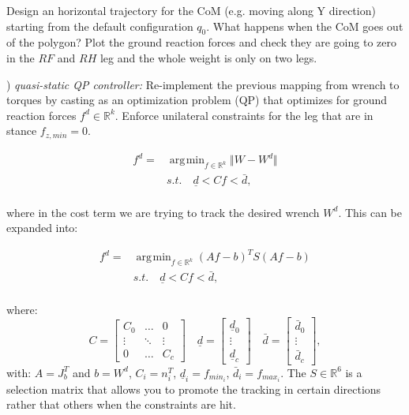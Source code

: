 \documentclass{report}
\newcommand{\Rnum}{\mathbb{R}} %
\newcommand{\mat}[1]{\ensuremath{\begin{bmatrix}#1\end{bmatrix}}}	%
\DeclareMathOperator*{\argmin}{\arg\!\min}				%
\begin{document}
Design an horizontal trajectory for the CoM (e.g. moving along Y direction) starting from the default configuration $q_0$. 
What happens when the CoM goes out of the polygon?
Plot the ground reaction forces and check they are going to zero in the $RF$ and $RH$ leg and the whole weight is only on two legs.

) \textit{quasi-static QP controller:}
Re-implement the previous mapping from wrench to torques by casting as an optimization problem (QP) that optimizes for ground reaction forces $f^d \in \Rnum^k$. 
Enforce unilateral constraints for the leg that are in stance $f_{z,min} = 0$. 

\begin{equation} 
\begin{aligned} 
f^d = & \argmin_{f \in \Rnum^k} \Vert W- W^d\Vert\\
& s.t. \quad \underline{d} < C f < \bar{d},\\
\end{aligned} 
\label{eq:min_prob}
\end{equation}

where in the cost term we are trying to track the desired wrench $W^d$. 
This can be expanded into:

\begin{equation} 
\begin{aligned} 
f^d = & \argmin_{f \in \Rnum^k}  (Af-b)^T S (Af-b)\\
& s.t. \quad \underline{d} < C f < \bar{d},\\
\end{aligned} 
\label{eq:min_prob}
\end{equation}

%
where:
\begin{equation}
C = \mat{C_0 & \dots & 0 \\ \vdots & \ddots & \vdots \\ 0 & \dots & C_c} \quad
\underline{d} = \mat{ \underline{d}_0 \\ \vdots \\ \underline{d}_c} \quad
\bar{d} = \mat{\bar{d}_0 \\ \vdots \\ \bar{d}_c},
\end{equation}
%
with: $A = J_b^T$ and $b = W^d$, $C_i = 	n_i^T$, $\underline{d}_i = 	f_{{min}_i}$, $\bar{d}_i =f_{{max}_i}$. The $S \in \Rnum^6$ is a selection matrix that allows you to promote the tracking in certain directions rather that others when the constraints are hit.
\end{document}
